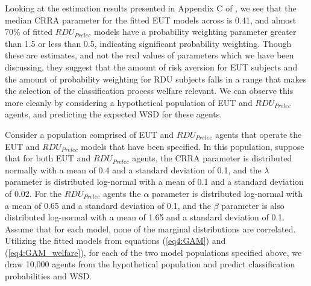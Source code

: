 \documentclass[../main.tex]{subfiles}
\begin{document}
Looking at the estimation results presented in Appendix C of \textcite{Harrison2016}, we see that the median CRRA parameter for the fitted EUT models across is 0.41, and almost 70\% of fitted $\mathit{RDU_{Prelec}}$ models have a probability weighting parameter greater than 1.5 or less than 0.5, indicating significant probability weighting.
Though these are estimates, and not the real values of parameters which we have been discussing, they suggest that the amount of risk aversion for EUT subjects and the amount of probability weighting for RDU subjects falls in a range that makes the selection of the classification process welfare relevant.
We can observe this more cleanly by considering a hypothetical population of EUT and $\mathit{RDU_{Prelec}}$ agents, and predicting the expected WSD for these agents.

Consider a population comprised of EUT and $\mathit{RDU_{Prelec}}$ agents that operate the EUT and $\mathit{RDU_{Prelec}}$ models that have been specified.
In this population, suppose that for both EUT and $\mathit{RDU_{Prelec}}$ agents, the CRRA parameter is distributed normally with a mean of 0.4 and a standard deviation of 0.1, and the $\lambda$ parameter is distributed log-normal with a mean of 0.1 and a standard deviation of 0.02.
For the $\mathit{RDU_{Prelec}}$ agents the $\alpha$ parameter is distributed log-normal with a mean of 0.65 and a standard deviation of 0.1, and the $\beta$ parameter is also distributed log-normal with a mean of 1.65 and a standard deviation of 0.1.
Assume that for each model, none of the marginal distributions are correlated.
Utilizing the fitted models from equations (\ref{eq4:GAM}) and (\ref{eq4:GAM_welfare}), for each of the two model populations specified above, we draw 10,000 agents from the hypothetical population and predict classification probabilities and WSD.
\end{document}
